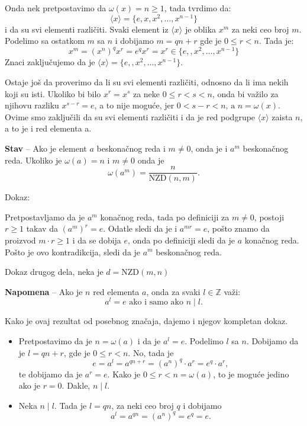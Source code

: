 \documentclass[a4paper,12pt]{article}
\begin{document}
Onda nek pretpostavimo da \( \omega(x) = n \geq 1 \), tada tvrdimo da:
\[
  \langle x \rangle = \{e, x, x^2, \dots, x^{n-1} \}
\]
i da su svi elementi različiti. Svaki element iz \( \langle x \rangle \) je oblika $x^m$ za neki ceo broj $m$. Podelimo sa ostatkom $m$ sa $n$ i dobijamo \( m = qn + r \) gde je \( 0 \leq r < n\).
Tada je:
\[
  x^m = (x^n)^qx^r = e^qx^r = x^r \in \{e, , x^2, \dots, x^{n-1} \}
\]
Znaci zaključujemo da je \( \langle x \rangle = \{e, , x^2, \dots, x^{n-1} \} \).

Ostaje još da proverimo da li su svi elementi različiti, odnosno da li ima nekih koji su isti. Ukoliko bi bilo \( x^r = x^s \) za neke \( 0 \leq r < s < n \),
onda bi važilo za njihovu razliku \( x^{s-r} = e \), a to nije moguće, jer \( 0 < s - r < n \text{, a } n = \omega(x) \).
Ovime smo zaključili da su svi elementi različiti i da je red podgrupe \( \langle x \rangle \) zaista $n$, a to je i red elementa a.

\medskip
\textbf{Stav} -- Ako je element \( a \) beskonačnog reda i \( m \neq 0 \), onda je i \( a^{m} \) beskonačnog reda. 
Ukoliko je \( \omega(a) = n \) i \( m \neq 0 \) onda je 
\[ 
  \omega(a^m) = \frac{n}{\text{NZD}(n, m)}.
\]

Dokaz:
 
Pretpostavljamo da je \( a^m \) konačnog reda, tada po definiciji za \( m \neq 0 \), postoji \( r \geq 1 \) takav da 
\( (a^m)^r = e \). Odatle sledi da je i \( a^{mr} = e \), pošto znamo da proizvod \(m\cdot r \geq 1\) i da se dobija \( e \), onda po definiciji sledi da je
\( a \) konačnog reda. Pošto je ovo kontradikcija, sledi da je \( a^m \) beskonačnog reda.

Dokaz drugog dela, neka je \( d = \text{NZD}(m, n) \)

\textbf{Napomena} -- Ako je \( n \) red elementa \( a \), onda za svaki \( l \in \mathbb{Z} \) važi:
\[
  a^l = e \text{ ako i samo ako } n \mid l.
\]

Kako je ovaj rezultat od posebnog zna\v{c}aja, dajemo i njegov kompletan dokaz.

\begin{itemize}
\item Pretpostavimo da je $n=\omega(a)$ i da je $a^l=e$. Podelimo $l$ sa $n$.
Dobijamo da je $l=qn+r$, gde je $0\le r<n$. No, tada je
\[
e=a^l=a^{qn+r}=(a^n)^q\cdot a^r=e^q\cdot a^r,
\]
te dobijamo da je $a^r=e$. Kako je $0\le r<n=\omega(a)$, to je mogu\'{c}e
jedino ako je $r=0$. Dakle, $n\mid l$.

\item Neka $n\mid l$. Tada je $l=qn$, za neki ceo broj $q$ i dobijamo
\[
a^l=a^{qn}=(a^n)^q=e^q=e.
\]
\end{itemize}
\end{document}
